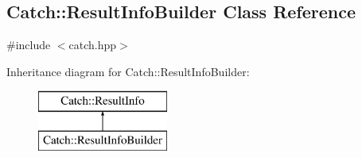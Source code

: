 \hypertarget{classCatch_1_1ResultInfoBuilder}{\subsection{Catch\-:\-:Result\-Info\-Builder Class Reference}
\label{classCatch_1_1ResultInfoBuilder}
}


{\ttfamily \#include $<$catch.\-hpp$>$}

Inheritance diagram for Catch\-:\-:Result\-Info\-Builder\-:\begin{figure}[H]
\begin{center}
\leavevmode
\includegraphics[height=2.000000cm]{classCatch_1_1ResultInfoBuilder}
\end{center}
\end{figure}
